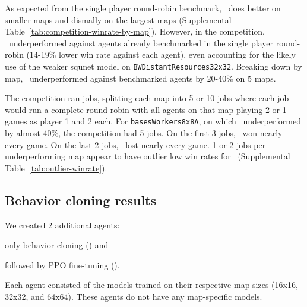 \documentclass[conference]{IEEEtran}
\begin{document}
As expected from the single player round-robin benchmark, \agentName\ does better on
smaller maps and dismally on the largest maps
(Supplemental Table~\ref{tab:competition-winrate-by-map}). However, in the competition, \agentName\
underperformed against agents already benchmarked in the single player round-robin
(14-19\% lower win rate against each agent), even accounting for the likely use of
the weaker squnet model on \texttt{BWDistantResources32x32}.  Breaking down by map, 
\agentName\ underperformed against benchmarked agents by 20-40\% on 5 maps.

The competition ran jobs, splitting each map into 5 or 10 jobs where
each job would run a complete round-robin with all agents on that map playing 2 or 1
games as player 1 and 2 each. For \texttt{basesWorkers8x8A}, on which \agentName\
underperformed by almost 40\%, the competition had 5 jobs. On the first 3 jobs,
\agentName\ won nearly every game. On the last 2 jobs, \agentName\ lost nearly every
game. 1 or 2 jobs per underperforming map appear to have outlier low win rates
for \agentName\ (Supplemental Table~\ref{tab:outlier-winrate}).

\subsection{Behavior cloning results}
\label{sec:behavior-cloning-results}
We created 2 additional agents:
\begin{inparaenum}[(1)]
    \item only behavior cloning (\bcAgent) and
    \item followed by PPO fine-tuning (\bcPPOAgent).
\end{inparaenum}
Each agent consisted of the models trained on their
respective map sizes (16x16, 32x32, and 64x64). These agents do not have any
map-specific models.
\end{document}
